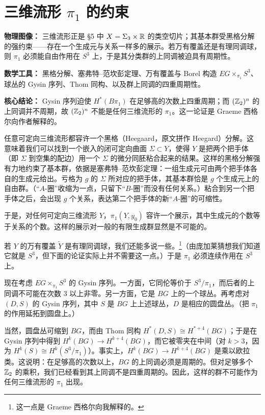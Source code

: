 \section{三维流形 $\pi_{1}$ 的约束}

\begin{keytakeaways}
\item \textbf{物理图像：} 三维流形正是 §5 中 $X=\Sigma_{3}\times\mathbb{R}$ 的类空切片；其基本群受黑格分解的强约束——存在一个生成元与关系一样多的展示。若万有覆盖还是有理同调球，则 $\pi_{1}$ 必须能自由作用在 $S^{3}$ 上，于是其分类群的上同调被迫具有周期性。
\item \textbf{数学工具：} 黑格分解、塞弗特--范坎彭定理、万有覆盖与 Borel 构造 $E G\times_{\pi_{1}}S^{3}$、球丛的 Gysin 序列、Thom 同构、以及群上同调的四重周期性。
\item \textbf{核心结论：} Gysin 序列迫使 $H^{*}(B\pi_{1})$ 在足够高的次数上四重周期；而 $(\mathbb{Z}_{2})^{n}$ 的上同调并不周期，故 $(\mathbb{Z}_{2})^{n}$ 不能是任何三维流形的 $\pi_{1}$。这一论证是 Graeme 西格尔向作者解释的。
\end{keytakeaways}

任意可定向三维流形都容许一个黑格（Heegaard，原文拼作 Heegard）分解。这意味着我们可以找到一个嵌入的闭可定向曲面 $\Sigma\subset Y$，使得 $Y$ 是把两个把手体（即 $\Sigma$ 到空集的配边）用一个 $\Sigma$ 的微分同胚粘合起来的结果。这样的黑格分解强有力地约束了基本群，依据是塞弗特--范坎彭定理：一组生成元可由两个把手体各自的生成元给出。亏格为 $g$ 的 $\Sigma$ 所对应的把手体，其基本群恰是 $g$ 个生成元上的自由群。（“$A$-圈”收缩为一点，只留下“$B$-圈”而没有任何关系。）粘合到另一个把手体之后，会出现 $g$ 个关系，表达第二个把手体的新“$A$-圈”的可缩性。

于是，对任何可定向三维流形 $Y$，$\pi_{1}(Y,y_{0})$ 容许一个展示，其中生成元的个数等于关系的个数。这样的展示对一般的有限生成群显然是不可能的。

若 $Y$ 的万有覆盖 $\tilde Y$ 是有理同调球，我们还能多说一些。\footnote{这一点是 Graeme 西格尔向我解释的。}（由庞加莱猜想我们知道它就是 $S^{3}$，但下面的论证实际上并不需要这一点。）于是 $\pi_{1}$ 必须连续作用在 $S^{3}$ 上。

现在考虑 $EG\times_{\pi_{1}}S^{3}$ 的 Gysin 序列。一方面，它同伦等价于 $S^{3}/\pi_{1}$，而后者的上同调不可能在次数 3 以上非零。另一方面，它是 $BG$ 上的一个球丛。再考虑对 $(D,S)$ 的 Gysin 序列，其中 $S$ 是 $BG$ 上上述球丛，$D$ 是相应的圆盘丛。（把 $\pi_{1}$ 的作用延拓到圆盘上。）

当然，圆盘丛可缩到 $BG$，而由 Thom 同构 $H^{*}(D,S)\cong H^{*+4}(BG)$；于是在 Gysin 序列中得到 $H^{k}(BG)\to H^{k+4}(BG)$，而它被零夹在中间（对 $k>3$，因为 $H^{k}(S)\cong H^{k}(S^{3}/\pi_{1})$）。事实上，$H^{k}(BG)\to H^{k+4}(BG)$ 是乘以欧拉类。这说明：在足够高的次数以上，$BG$ 的上同调必须是周期的。但对足够多个 $\mathbb{Z}_{2}$ 的乘积，我们已经看到其上同调不是四重周期的。因此，这样的群不可能作为任何三维流形的 $\pi_{1}$ 出现。

